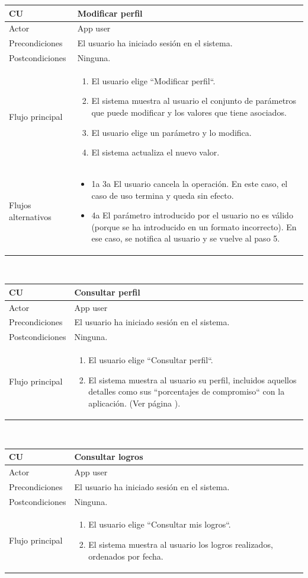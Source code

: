 \documentclass[twoside]{report}
\newcommand\addrow[2]{#1 &#2\\ }
\newcommand\addheading[2]{#1 &#2\\ \hline}
\newcommand\tabularhead{\begin{tabular}{lp{0.7\textwidth}}
\hline
}
\newenvironment{usecase}{\tabularhead}
{\hline\end{tabular}}
\begin{document}
\begin{usecase}
  \addheading{\textbf{CU\arabic{usecase}}}{Modificar perfil} 
  \addrow{Actor}{App user}
  \addrow{Precondiciones}{El usuario ha iniciado sesión en el sistema.}
  \addrow{Postcondiciones}{Ninguna.}
  \addrow{Flujo principal}{
  		\begin{enumerate}
  		\item El usuario elige “Modificar perfil“. %
  		\item El sistema muestra al usuario el conjunto de parámetros que puede modificar y los valores que tiene asociados. %
  		\item El usuario elige un parámetro y lo modifica. %
  		\item El sistema actualiza el nuevo valor. %
  		\end{enumerate}
  }
  \addrow{Flujos alternativos}{
  		\begin{itemize}
  		\item 1a 3a El usuario cancela la operación. En este caso, el caso de uso termina y queda sin efecto.
  		\item 4a El parámetro introducido por el usuario no es válido (porque se ha introducido en un formato incorrecto). En ese caso, se notifica al usuario y se vuelve al paso 5.
  		\end{itemize}
  		}
\end{usecase}\\

\begin{usecase}
  \addheading{\textbf{CU\arabic{usecase}}}{Consultar perfil} 
  \addrow{Actor}{App user}
  \addrow{Precondiciones}{El usuario ha iniciado sesión en el sistema.}
  \addrow{Postcondiciones}{Ninguna.}
  \addrow{Flujo principal}{
  		\begin{enumerate}
  		\item El usuario elige “Consultar perfil“.
  		\item El sistema muestra al usuario su perfil, incluidos aquellos detalles como sus  “porcentajes de compromiso“ con la aplicación. (Ver página \pageref{rfcompromiso}).
  		\end{enumerate}
  }
\end{usecase}\\

\begin{usecase}
  \addheading{\textbf{CU\arabic{usecase}}}{Consultar logros} 
  \addrow{Actor}{App user}
  \addrow{Precondiciones}{El usuario ha iniciado sesión en el sistema.}
  \addrow{Postcondiciones}{Ninguna.}
  \addrow{Flujo principal}{
  		\begin{enumerate}
  		\item El usuario elige “Consultar mis logros“.
  		\item El sistema muestra al usuario los logros realizados, ordenados por fecha.
  		\end{enumerate}
  }
\end{usecase}\\
\end{document}
